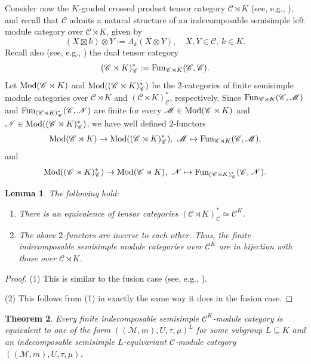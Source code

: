 \documentclass{amsart}
\newtheorem{theorem}{Theorem}[section]
\newtheorem{lemma}[theorem]{Lemma}
\theoremstyle{definition}
\newcommand{\Fun}{{\rm Fun}}
\newcommand{\C}{\mathscr{C}}
\newcommand{\M}{\mathscr{M}}
\newcommand{\ot}{\otimes}
\numberwithin{equation}{section}
\begin{document}
Consider now the $K$-graded crossed product tensor category $\C\rtimes K$ (see, e.g., \cite[Definition 4.15.5]{EGNO}), and recall that $\C$ admits a natural structure of an indecomposable semisimple left module category over $\C\rtimes K$, given by
$$(X\boxtimes k)\ot Y:=A_k(X\ot Y),\quad X,Y\in \C,\,k\in K.$$
Recall also (see, e.g., \cite[Definition 7.12.2]{EGNO}) the dual tensor category 
\begin{equation}\label{dtc}
(\C\rtimes K)^*_{\C}:={\rm Fun}_{\C\rtimes K}(\C,\C).
\end{equation}
Let ${\rm Mod}(\C\rtimes K)$ and ${\rm Mod}((\C\rtimes K)^*_{\C})$ be the $2$-categories of finite semisimple module categories over $\C\rtimes K$ and $(\C\rtimes K)^*_{\C}$, respectively. Since $\Fun_{\C\rtimes K}(\C,\mathscr{M})$ and $\Fun_{(\C\rtimes K)^*_{\C}}(\C,\mathscr{N})$ are finite for every $\mathscr{M}\in {\rm Mod}(\C\rtimes K)$ and $\mathscr{N}\in {\rm Mod}((\C\rtimes K)^*_{\C})$, we have well defined $2$-functors
$${\rm Mod}(\C\rtimes K)\to {\rm Mod}((\C\rtimes K)^*_{\C}),\,\,
\mathscr{M}\mapsto\Fun_{\C\rtimes K}(\C,\mathscr{M}),$$ 
and
$${\rm Mod}((\C\rtimes K)^*_{\C})\to {\rm Mod}(\C\rtimes K),\,\,
\mathscr{N}\mapsto\Fun_{(\C\rtimes K)^*_{\C}}(\C,\mathscr{N}).$$

\begin{lemma}\label{implem}
The following hold:
\begin{enumerate}
\item
There is an equivalence of tensor categories $(\C\rtimes K)^*_{\C}\simeq \C^K$.
\item
The above $2$-functors are inverse to each other.
Thus, the finite indecomposable semisimple module categories over $\C^K$ are in bijection with those over $\C\rtimes K$.
\end{enumerate}
\end{lemma}

\begin{proof}
(1) This is similar to the fusion case (see, e.g., \cite[Example 7.12.25]{EGNO}).

(2) This follows from (1) in exactly the same way it does in the fusion case.
\end{proof}

\begin{theorem}\label{eno}
Every finite indecomposable semisimple $\C^K$-module category is equivalent to one of the form $((\M,m),U,\tau,\mu)^L$ for some subgroup $L\subseteq K$ and an 
indecomposable semisimple $L$-equivariant $\C$-module category $((\M,m),U,\tau,\mu)$.
\end{theorem}
\end{document}
